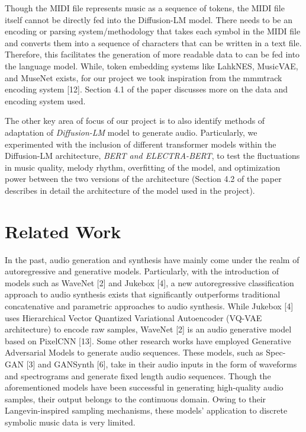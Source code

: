 \documentclass{article}
\begin{document}
Though the MIDI file represents music as a sequence of tokens, the MIDI file itself cannot be directly fed into the Diffusion-LM model. There needs to be an encoding or parsing system/methodology that takes each symbol in the MIDI file and converts them into a sequence of characters that can be written in a text file. Therefore, this facilitates the generation of more readable data to can be fed into the language model. While, token embedding systems like LahkNES, MusicVAE, and MuseNet exists, for our project we took inspiration from the mmmtrack encoding system [12]. Section 4.1 of the paper discusses more on the data and encoding system used. 

The other key area of focus of our project is to also identify methods of adaptation of \textit{Diffusion-LM} model to generate audio. Particularly, we experimented with the inclusion of different transformer models within the Diffusion-LM architecture, \textit{BERT and ELECTRA-BERT}, to test the fluctuations in music quality, melody rhythm, overfitting of the model, and optimization power between the two versions of the architecture (Section 4.2 of the paper describes in detail the architecture of the model used in the project). 


\section{Related Work}

In the past, audio generation and synthesis have mainly come under the realm of autoregressive and generative models. Particularly, with the introduction of models such as WaveNet [2] and Jukebox [4], a new autoregressive classification approach to audio synthesis exists that significantly outperforms traditional concatenative and parametric approaches to audio synthesis. While Jukebox [4] uses Hierarchical Vector Quantized Variational Autoencoder (VQ-VAE architecture) to encode raw samples, WaveNet [2] is an audio generative model based on PixelCNN [13]. Some other research works have employed Generative Adversarial Models to generate audio sequences. These models, such as Spec-GAN [3] and GANSynth [6], take in their audio inputs in the form of waveforms and spectrograms and generate fixed length audio sequences. Though the aforementioned models have been successful in generating high-quality audio samples, their output belongs to the continuous domain. Owing to their Langevin-inspired sampling mechanisms, these models' application to discrete symbolic music data is very limited. 
\end{document}

